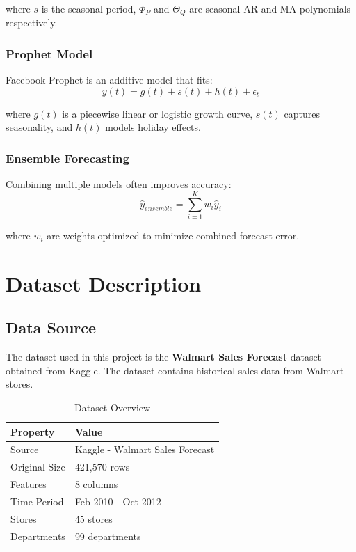 \documentclass[12pt,a4paper]{report}
\begin{document}
where $s$ is the seasonal period, $\Phi_P$ and $\Theta_Q$ are seasonal AR and MA polynomials respectively.

\subsection{Prophet Model}

Facebook Prophet is an additive model that fits:
\begin{equation}
y(t) = g(t) + s(t) + h(t) + \epsilon_t
\end{equation}

where $g(t)$ is a piecewise linear or logistic growth curve, $s(t)$ captures seasonality, and $h(t)$ models holiday effects.

\subsection{Ensemble Forecasting}

Combining multiple models often improves accuracy:
\begin{equation}
\hat{y}_{ensemble} = \sum_{i=1}^{K} w_i \hat{y}_i
\end{equation}

where $w_i$ are weights optimized to minimize combined forecast error.

\chapter{Dataset Description}
\label{ch:dataset}

\section{Data Source}
\label{sec:data_source}
The dataset used in this project is the \textbf{Walmart Sales Forecast} dataset obtained from Kaggle. The dataset contains historical sales data from Walmart stores.

\begin{table}[H]
\centering
\caption{Dataset Overview}
\begin{tabular}{ll}
\toprule
\textbf{Property} & \textbf{Value} \\
\midrule
Source & Kaggle - Walmart Sales Forecast \\
Original Size & 421,570 rows \\
Features & 8 columns \\
Time Period & Feb 2010 - Oct 2012 \\
Stores & 45 stores \\
Departments & 99 departments \\
\bottomrule
\end{tabular}
\end{table}
\end{document}
